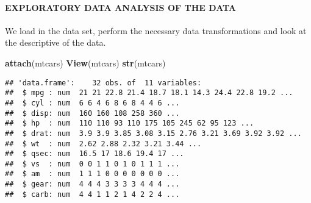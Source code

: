 \documentclass[
]{article}
\newenvironment{Shaded}{\begin{snugshade}}{\end{snugshade}}
\newcommand{\CommentTok}[1]{\textcolor[rgb]{0.56,0.35,0.01}{\textit{#1}}}
\newcommand{\DataTypeTok}[1]{\textcolor[rgb]{0.13,0.29,0.53}{#1}}
\newcommand{\KeywordTok}[1]{\textcolor[rgb]{0.13,0.29,0.53}{\textbf{#1}}}
\newcommand{\NormalTok}[1]{#1}
\newcommand{\OperatorTok}[1]{\textcolor[rgb]{0.81,0.36,0.00}{\textbf{#1}}}
\newcommand{\StringTok}[1]{\textcolor[rgb]{0.31,0.60,0.02}{#1}}
\begin{document}
\hypertarget{exploratory-data-analysis-of-the-data}{%
\paragraph{EXPLORATORY DATA ANALYSIS OF THE
DATA}\label{exploratory-data-analysis-of-the-data}}

We load in the data set, perform the necessary data transformations and
look at the descriptive of the data.

\begin{Shaded}
\begin{Highlighting}[]
\KeywordTok{attach}\NormalTok{(mtcars)}
\KeywordTok{View}\NormalTok{(mtcars)}
\KeywordTok{str}\NormalTok{(mtcars)}
\end{Highlighting}
\end{Shaded}

\begin{verbatim}
## 'data.frame':    32 obs. of  11 variables:
##  $ mpg : num  21 21 22.8 21.4 18.7 18.1 14.3 24.4 22.8 19.2 ...
##  $ cyl : num  6 6 4 6 8 6 8 4 4 6 ...
##  $ disp: num  160 160 108 258 360 ...
##  $ hp  : num  110 110 93 110 175 105 245 62 95 123 ...
##  $ drat: num  3.9 3.9 3.85 3.08 3.15 2.76 3.21 3.69 3.92 3.92 ...
##  $ wt  : num  2.62 2.88 2.32 3.21 3.44 ...
##  $ qsec: num  16.5 17 18.6 19.4 17 ...
##  $ vs  : num  0 0 1 1 0 1 0 1 1 1 ...
##  $ am  : num  1 1 1 0 0 0 0 0 0 0 ...
##  $ gear: num  4 4 4 3 3 3 3 4 4 4 ...
##  $ carb: num  4 4 1 1 2 1 4 2 2 4 ...
\end{verbatim}

\begin{Shaded}
\end{Shaded}
\end{document}
